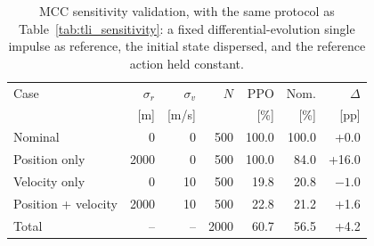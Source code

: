 \begin{table}[hbt!]
\centering
\small
\caption{MCC sensitivity validation, with the same protocol as Table~\ref{tab:tli_sensitivity}: a fixed differential-evolution single impulse as reference, the initial state dispersed, and the reference action held constant.}
\label{tab:mcc_sensitivity}
\begin{tabular}{lrrrrrr}
\toprule
Case & $\sigma_r$ & $\sigma_v$ & $N$ & PPO & Nom. & $\Delta$ \\
 & [m] & [m/s] & & [\%] & [\%] & [pp] \\
\midrule
Nominal & 0 & 0 & 500 & 100.0 & 100.0 & +0.0 \\
Position only & 2000 & 0 & 500 & 100.0 & 84.0 & +16.0 \\
Velocity only & 0 & 10 & 500 & 19.8 & 20.8 & $-1.0$ \\
Position + velocity & 2000 & 10 & 500 & 22.8 & 21.2 & +1.6 \\
\midrule
Total & -- & -- & 2000 & 60.7 & 56.5 & +4.2 \\
\bottomrule
\end{tabular}
\end{table}